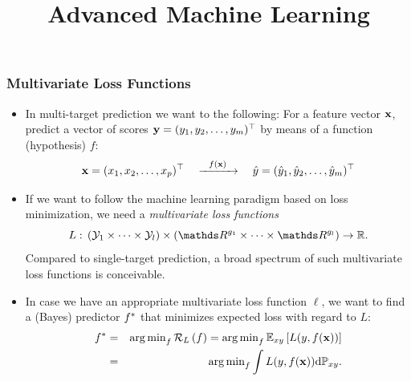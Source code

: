 \documentclass[11pt,compress,t,notes=noshow, xcolor=table]{beamer}
\title{Advanced Machine Learning}
\date{}
\begin{document}



\sloppy


\begin{frame}
	\frametitle{Multivariate Loss Functions}
	\begin{itemize}
%		
		\small
%		
		\item In multi-target prediction we want to the following: For a feature vector $\mathbf{x}$, predict a vector of scores $\mathbf{y} = (y_1, y_2, \ldots, y_m)^\top$ by means of a function (hypothesis) $f$:
		$$
		\mathbf{x} = (x_1,x_2,\ldots,x_p)^\top \quad \xrightarrow{~~f(\mathbf{x})~~} \quad \hat{y} = ( \hat{y}_1, \hat{y}_2, \ldots, \hat{y}_m)^\top
		$$
%		
		\item If we want to follow the machine learning paradigm based on loss minimization, we need a \emph{multivariate loss functions} 
		$$
		L: \, (\Yspace_1 \times \cdots \times \Yspace_l) \times (\R^{g_1} \times \cdots \times \R^{g_l}) \rightarrow \mathbb{R}.
		$$  
		Compared to single-target prediction,  a broad spectrum of such multivariate loss functions	is conceivable. 
%		
		\item In case we have an appropriate multivariate loss function $\ell$, we want to find a (Bayes) predictor $f^{\ast}$ that minimizes expected loss with regard to $L$:
%		
		\begin{eqnarray*}
			f^{\ast} &=& \operatorname{arg\,min}_{f} \mathcal{R}_L \left(f\right) = \operatorname{arg\,min}_{f}\mathbb{E}_{xy}\left[ L(y,f(\mathbf{x})) \right]\\ &=&  \operatorname{arg\,min}_{f}\int L(y,f(\mathbf{x})) \text{d}\mathbb{P}_{xy}. 
		\end{eqnarray*}
%				
%		
%
	\end{itemize}
	
\end{frame}
\end{document}
